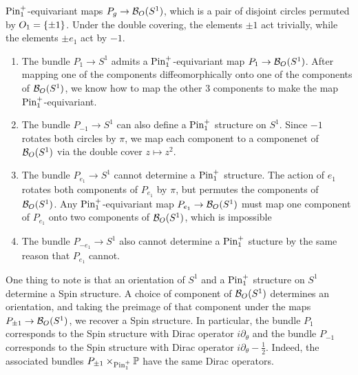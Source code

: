 \begin{exmp}
$\mathrm{Pin}_1^+$-equivariant maps $P_g \to \mathcal{B}_O(S^1)$, which is a pair of disjoint
circles permuted by $O_1 = \left\lbrace \pm 1 \right\rbrace$. Under the double covering, the
elements $\pm 1$ act trivially, while the elements $\pm e_1$ act by $-1$.
%
\begin{enumerate}
  \item The bundle $P_1 \to S^1$ admits a $\mathrm{Pin}_1^+$-equivariant map
  $P_1 \to \mathcal{B}_O(S^1)$. After mapping one of the components diffeomorphically
  onto one of the components of $\mathcal{B}_O(S^1)$, we know how to map
  the other $3$ components to make the map $\mathrm{Pin}_1^+$-equivariant.
  \item The bundle $P_{-1} \to S^1$ can also define a $\mathrm{Pin}_1^+$ structure on
  $S^1$. Since $-1$ rotates both circles by $\pi$, we map each component to
  a componenet of $\mathcal{B}_O(S^1)$ via the double cover $z \mapsto z^2$.
  \item The bundle $P_{e_1} \to S^1$ cannot determine a $\mathrm{Pin}^+_1$ structure.
  The action of $e_1$ rotates both components of $P_{e_1}$ by $\pi$, but
  permutes the components of $\mathcal{B}_O(S^1)$. Any $\mathrm{Pin}_1^+$-equivariant map
  $P_{e_1} \to \mathcal{B}_O(S^1)$ must map one component of $P_{e_1}$ onto two
  components of $\mathcal{B}_O(S^1)$, which is impossible
  \item The bundle $P_{-e_1} \to S^1$ also cannot determine a $\mathrm{Pin}_1^+$
  stucture by the same reason that $P_{e_1}$ cannot.
\end{enumerate}
%
One thing to note is that an orientation of $S^1$ and a $\mathrm{Pin}_1^+$ structure
on $S^1$ determine a Spin structure. A choice of component of $\mathcal{B}_O(S^1)$
determines an orientation, and taking the preimage of that component
under the maps $P_{\pm 1} \to \mathcal{B}_O(S^1)$, we recover a Spin structure. In
particular, the bundle $P_1$ corresponds to the Spin structure with Dirac operator
$i\partial_\theta$ and the bundle $P_{-1}$ corresponds to the Spin structure
with Dirac operator $i\partial_\theta - \frac{1}{2}$.  Indeed, the associated
bundles $P_{\pm 1} \times_{\mathrm{Pin}_1^+} \mathbb{P}$ have the same Dirac operators. \\


\end{exmp}
